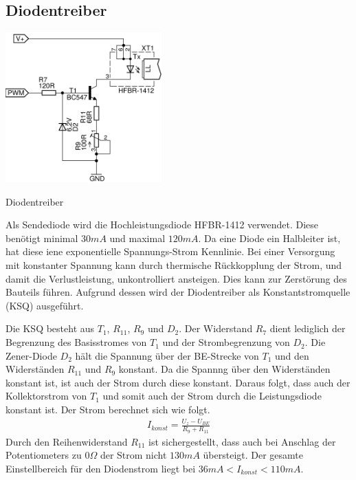 \subsection{Diodentreiber}
\label{sec:ksq}
\noindent
\begin{floatingfigure}[r]{6.5cm}
\centering
\includegraphics[width=6cm]{gfx/diodentreiber.pdf}
\caption{Diodentreiber}
\label{fig:diodedriver}
\end{floatingfigure}
Als Sendediode wird die Hoch\-leis\-tungs\-diode \textsc{HFBR-1412} verwendet. Diese benötigt minimal $30mA$ und maximal $120mA$. Da eine Diode ein Halbleiter ist, hat diese iene exponentielle Span\-nungs-Strom Kennlinie. Bei einer Versorgung mit konstanter Spannung kann durch thermische Rückkopplung der Strom, und damit die Verlustleistung, unkontrolliert ansteigen. Dies kann zur Zer\-störung des Bauteils führen. Aufgrund dessen wird der Diodentreiber als Kon\-stant\-strom\-quel\-le (KSQ) ausgeführt.

Die KSQ besteht aus $T_1$, $R_{11}$, $R_9$ und $D_2$. Der Widerstand $R_7$ dient lediglich der Begrenzung des Basisstromes von $T_1$ und der Strombegrenzung von $D_2$.
Die Zener-Diode $D_2$ hält die Spannung über der BE-Strecke von $T_1$ und den Widerständen $R_{11}$ und $R_9$ konstant. Da die Spannng über den Widerständen konstant ist, ist auch der Strom durch diese konstant. Daraus folgt, dass auch der Kollektorstrom von $T_1$ und somit auch der Strom durch die Leistungsdiode konstant ist.
Der Strom berechnet sich wie folgt.
\begin{align}
I_{konst} = \frac{U_z-U_{BE}}{R_9+R_{11}}
\end{align} 
Durch den Reihenwiderstand $R_{11}$	ist sichergestellt, dass auch bei Anschlag der Potentiometers zu $0\Omega$ der Strom nicht $130mA$ übersteigt. Der gesamte Einstellbereich für den Diodenstrom liegt bei $36mA < I_{konst}< 110mA$.
\newpage